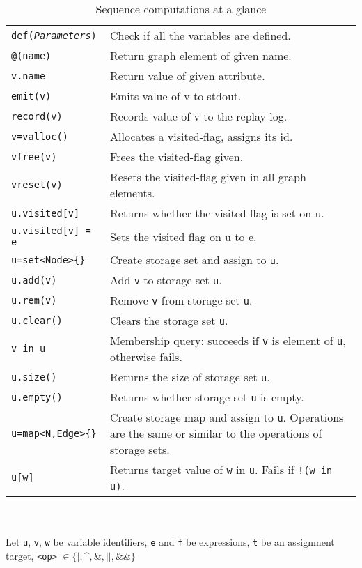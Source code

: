 \begin{table}[htbp]
\begin{minipage}{\linewidth} \renewcommand{\footnoterule}{} 
\begin{tabularx}{\linewidth}{|lX|}
\hline
\texttt{def(\emph{Parameters})} & Check if all the variables are defined.\\
\texttt{@(name)} & Return graph element of given name.\\
\texttt{v.name} & Return value of given attribute.\\
\texttt{emit(v)} & Emits value of v to stdout.\\
\texttt{record(v)} & Records value of v to the replay log.\\
\hline
\texttt{v=valloc()} & Allocates a visited-flag, assigns its id.\\
\texttt{vfree(v)} & Frees the visited-flag given.\\
\texttt{vreset(v)} & Resets the visited-flag given in all graph elements.\\
\texttt{u.visited[v]} & Returns whether the visited flag is set on u.\\
\texttt{u.visited[v] = e} & Sets the visited flag on u to e.\\
\hline
\texttt{u=set<Node>\{\}}	& Create storage set and assign to \texttt{u}.\\
\texttt{u.add(v)}	& Add \texttt{v} to storage set \texttt{u}.\\
\texttt{u.rem(v)}	& Remove \texttt{v} from storage set \texttt{u}.\\
\texttt{u.clear()}	& Clears the storage set \texttt{u}.\\
\texttt{v in u} & Membership query: succeeds if \texttt{v} is element of \texttt{u}, otherwise fails.\\
\texttt{u.size()}	& Returns the size of storage set \texttt{u}.\\
\texttt{u.empty()} & Returns whether storage set \texttt{u} is empty.\\
\texttt{u=map<N,Edge>\{\}}	& Create storage map and assign to \texttt{u}. Operations are the same or similar to the operations of storage sets.\\
\texttt{u[w]}	& Returns target value of \texttt{w} in \texttt{u}. Fails if \texttt{!(w in u)}.\\
\hline
\end{tabularx}\indexmain{\texttt{\textasciicircum}}\indexmain{\texttt{\&\&}}
\indexmain{\texttt{\&}}\indexmain{\texttt{*}}\indexmain{\texttt{;>}}\indexmain{\texttt{<;}}\indexmain{\texttt{+}}\indexmain{\texttt{[]}}\indexmain{\texttt{<>}}\indexmain{\texttt{<<;>>}}\indexmain{\texttt{()}}
\end{minipage}\\
\\ 
{\small Let \texttt{u}, \texttt{v}, \texttt{w} be variable identifiers, \texttt{e} and \texttt{f} be expressions, \texttt{t} be an assignment target, \texttt{<op>} $\in \{\texttt{|}, \texttt{\textasciicircum}, \texttt{\&}, \texttt{||}, \texttt{\&\&}\}$ }%
\caption{Sequence computations at a glance}
\label{comptab}
\end{table}
 
